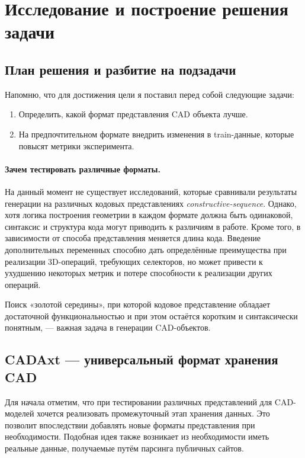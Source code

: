 \section{Исследование и построение решения задачи}
\label{sec:Chapter3} 

\subsection{План решения и разбитие на подзадачи}

Напомню, что для достижения цели я поставил перед собой следующие задачи:
\begin{enumerate}
    \item Определить, какой формат представления CAD объекта лучше.
    \item На предпочтительном формате внедрить изменения в train-данные, которые повысят метрики эксперимента.
\end{enumerate}

\paragraph{Зачем тестировать различные форматы.}
На данный момент не существует исследований, которые сравнивали результаты генерации на различных кодовых представлениях \textit{constructive-sequence}.
Однако, хотя логика построения геометрии в каждом формате должна быть одинаковой, синтаксис и структура кода могут приводить к различиям в работе.
Кроме того, в зависимости от способа представления меняется длина кода.
Введение дополнительных переменных способно дать определённые преимущества при реализации 3D-операций, требующих селекторов,
но может привести к ухудшению некоторых метрик и потере способности к реализации других операций.

Поиск «золотой середины», при которой кодовое представление обладает достаточной функциональностью и при этом остаётся коротким и синтаксически понятным, — важная задача в генерации CAD-объектов.

\subsection{CADAxt — универсальный формат хранения CAD}
Для начала отметим, что при тестировании различных представлений для CAD-моделей
хочется реализовать промежуточный этап хранения данных. Это позволит впоследствии
добавлять новые форматы представления при необходимости. Подобная идея также
возникает из необходимости иметь реальные данные, получаемые путём парсинга публичных сайтов.

